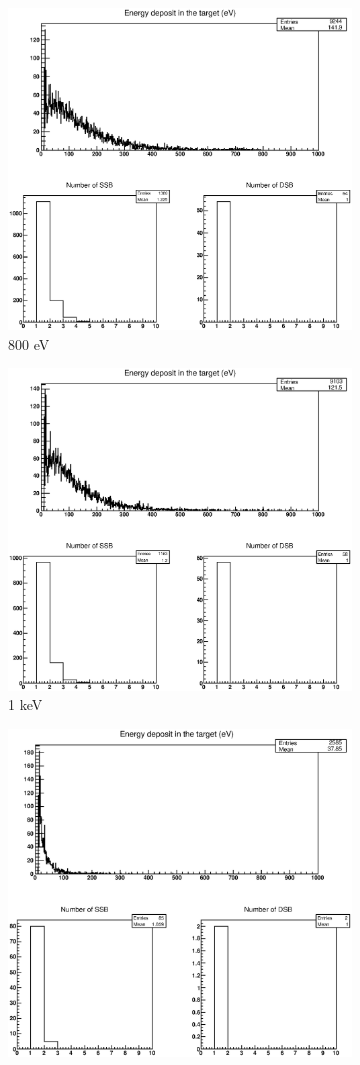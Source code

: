 \begin{figure}
\begin{subfigure}{.5\textwidth}
  \includegraphics[width=.78\linewidth]{./Figures/e-800ev.eps}
  \caption{800 eV}
  \label{fig:sube5}
\end{subfigure}%
\begin{subfigure}{.5\textwidth}
  \centering
  \includegraphics[width=.78\linewidth]{./Figures/e1kev.eps}
  \caption{1 keV}
  \label{fig:sube6}
\end{subfigure}
\begin{subfigure}{.5\textwidth}
  \centering
  \includegraphics[width=.78\linewidth]{./Figures/e20kev.eps}

\end{subfigure}
\end{figure}

